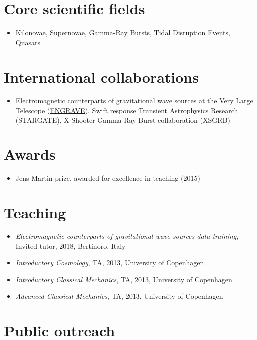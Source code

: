 \documentclass[12pt,letterpaper]{article}
\begin{document}
\section*{Core scientific  fields}

\begin{itemize}
	\item Kilonovae, Supernovae, Gamma-Ray Bursts, Tidal Disruption Events, Quasars
\end{itemize}


\section*{International collaborations}

\begin{itemize}
	\item Electromagnetic counterparts of gravitational wave sources at the Very Large Telescope (\href{http://www.engrave-eso.org}{ENGRAVE}), Swift response Transient Astrophysics Research (STARGATE), X-Shooter Gamma-Ray Burst collaboration (XSGRB)
\end{itemize}


\section*{Awards}

\begin{itemize}
	\item Jens Martin prize, awarded for excellence in teaching (2015)
\end{itemize}


\section*{Teaching}

\begin{itemize}
	\item \emph{Electromagnetic counterparts of gravitational wave sources data training}, Invited tutor, 2018, Bertinoro, Italy
	\item \emph{Introductory Cosmology}, TA, 2013, University of Copenhagen
	\item \emph{Introductory Classical Mechanics}, TA, 2013, University of Copenhagen
	\item \emph{Advanced Classical Mechanics}, TA, 2013, University of Copenhagen
\end{itemize}

\section*{Public outreach}
\end{document}
